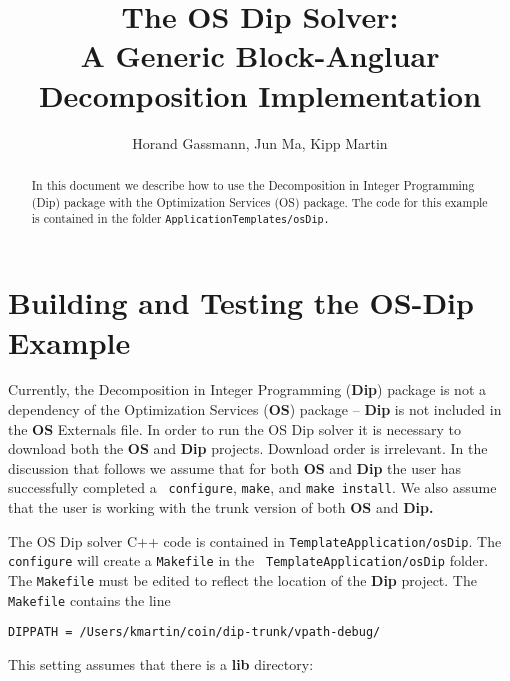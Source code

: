 \documentclass[11pt]{article}
\begin{document}
\title{The OS Dip Solver:\\
A Generic Block-Angluar Decomposition Implementation}
\vskip 2in
\author{Horand Gassmann, Jun Ma,  Kipp Martin}
\maketitle

\begin{abstract}
In this document we describe how to use the Decomposition in Integer Programming
(Dip) package with the Optimization Services (OS) package.  The code for this
example is contained in the folder {\tt  ApplicationTemplates/osDip.}

\end{abstract}


\newpage
{}


 

\newpage

\section{Building and Testing the OS-Dip Example}\label{section:build}

Currently, the Decomposition in Integer Programming ({\bf Dip}) package is not a
dependency of the Optimization Services ({\bf OS}) package -- {\bf Dip} is not
included in the {\bf OS} Externals file. In order to run the OS Dip solver it is
necessary to download both the {\bf OS} and {\bf  Dip} projects. Download order is irrelevant. 
In the discussion that follows we assume that for both 
{\bf OS} and {\bf Dip} the user has successfully completed a {\tt
configure}, {\tt make}, and {\tt make install}. We also assume
that the user is working with the trunk version of both {\bf OS} and {\bf Dip.}


The OS Dip solver C++ code is contained in {\tt TemplateApplication/osDip}.
 The {\tt configure}  will create a {\tt Makefile}  in the {\tt
 TemplateApplication/osDip} folder. The {\tt Makefile} must be edited to reflect
 the location of the {\bf Dip} project. The {\tt Makefile} contains the
 line

\begin{verbatim}
DIPPATH = /Users/kmartin/coin/dip-trunk/vpath-debug/
\end{verbatim}

This setting assumes that there is a {\bf lib} directory:
\end{document}
